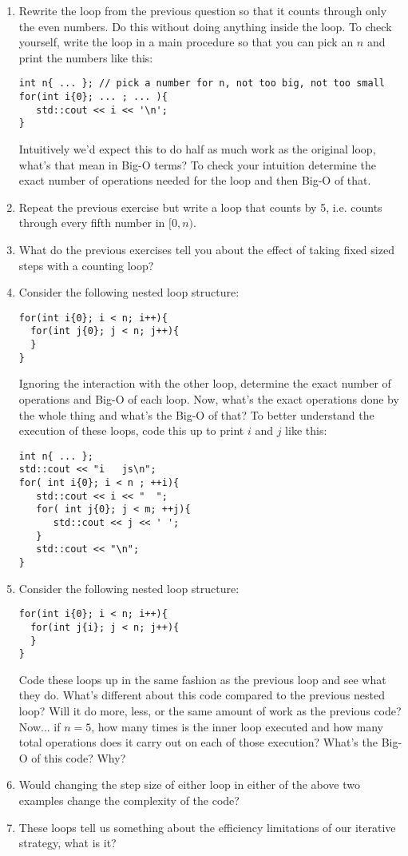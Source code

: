 \documentclass[10pt]{article}
\begin{document}
\begin{enumerate}
\vspace{1in}
\item Rewrite the loop from the previous question so that it counts through only the even numbers. Do this without doing anything inside the loop. To check yourself, write the loop in a main procedure so that you can pick an $n$ and print the numbers like this:
\begin{lstlisting}
int n{ ... }; // pick a number for n, not too big, not too small
for(int i{0}; ... ; ... ){
   std::cout << i << '\n';
}
\end{lstlisting}
Intuitively we'd expect this to do half as much work as the original loop, what's that mean in Big-O terms? To check your intuition determine the exact number of operations needed for the loop and then Big-O of that. 
\vspace{2in}
\item Repeat the previous exercise but write a loop that counts by 5, i.e. counts through every fifth number in $[0,n)$. 
\newpage \thispagestyle{empty}
\item What do the previous exercises tell you about the effect of taking fixed sized steps with a counting loop? 
\vspace{2in}
\item Consider the following nested loop structure:
\begin{lstlisting}
for(int i{0}; i < n; i++){
  for(int j{0}; j < n; j++){  
  }
}
\end{lstlisting}
Ignoring the interaction with the other loop, determine the exact number of operations and Big-O of each loop. Now, what's the exact operations done by the whole thing and what's the Big-O of that? To better understand the execution of these loops, code this up to print $i$ and $j$ like this:
\begin{lstlisting}
int n{ ... };
std::cout << "i   js\n";
for( int i{0}; i < n ; ++i){
   std::cout << i << "  ";
   for( int j{0}; j < m; ++j){
      std::cout << j << ' ';
   }
   std::cout << "\n";
}
\end{lstlisting}
\newpage \thispagestyle{empty}
\item Consider the following nested loop structure:
\begin{lstlisting}
for(int i{0}; i < n; i++){
  for(int j{i}; j < n; j++){  
  }
}
\end{lstlisting}
Code these loops up in the same fashion as the previous loop and see what they do. What's different about this code compared to the previous nested loop? Will it do more, less, or the same amount of work as the previous code? Now... if $n=5$, how many times is the inner loop executed and how many total operations does it carry out on each of those execution? What's the Big-O of this code? Why? 
\vspace{2in}
\item Would changing the step size of either loop in either of the above two examples change the complexity of the code?
\vspace{2in}
\item These loops tell us something about the efficiency limitations of our iterative strategy, what is it? 
\end{enumerate}
\end{document}
